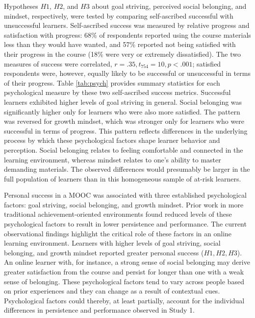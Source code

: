 \documentclass{sigchi}\usepackage[]{graphicx}\usepackage[]{color}
\begin{document}
Hypotheses $H1$, $H2$, and $H3$ about goal striving, perceived social belonging, and mindset, respectively, were tested by comparing self-ascribed successful with unsuccessful learners. Self-ascribed success was measured by relative progress and satisfaction with progress: 68\% of respondents reported using the course materials less than they would have wanted, and 57\% reported not being satisfied with their progress in the course (18\% were very or extremely dissatisfied). The two measures of success were correlated, $r=.35, t_{754}=10, p<.001$; satisfied respondents were, however, equally likely to be successful or unsuccessful in terms of their progress. Table \ref{tab:psych} provides summary statistics for each psychological measure by these two self-ascribed success metrics. Successful learners exhibited higher levels of goal striving in general. Social belonging was significantly higher only for learners who were also more satisfied. The pattern was reversed for growth mindset, which was stronger only for learners who were successful in terms of progress. This pattern reflects differences in the underlying process by which these psychological factors shape learner behavior and perception. Social belonging relates to feeling comfortable and connected in the learning environment, whereas mindset relates to one's ability to master demanding materials. The observed differences would presumably be larger in the full population of learners than in this homogeneous sample of at-risk learners.

Personal success in a MOOC was associated with three established psychological factors: goal striving, social belonging, and growth mindset. Prior work in more traditional achievement-oriented environments found reduced levels of these psychological factors to result in lower persistence and performance. The current observational findings highlight the critical role of these factors in an online learning environment. Learners with higher levels of goal striving, social belonging, and growth mindset reported greater personal success ($H1,H2,H3$). An online learner with, for instance, a strong sense of social belonging may derive greater satisfaction from the course and persist for longer than one with a weak sense of belonging. These psychological factors tend to vary across people based on prior experiences and they can change as a result of contextual cues. Psychological factors could thereby, at least partially, account for the individual differences in persistence and performance observed in Study 1.
\end{document}
